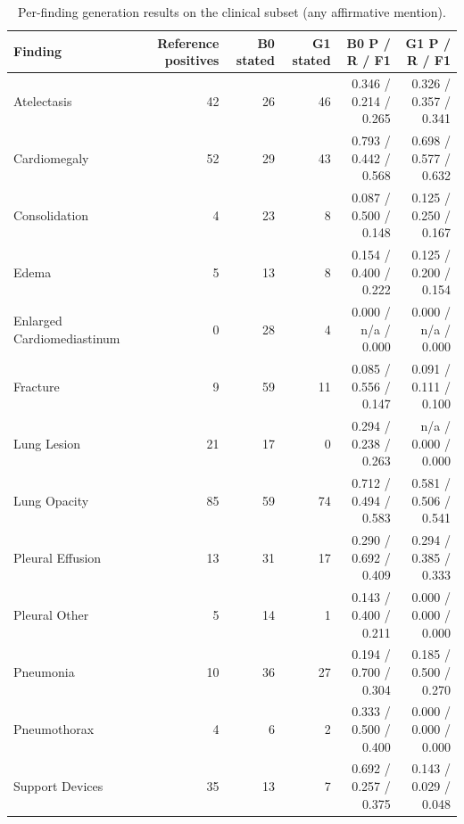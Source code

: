 \begin{table}[t]
\centering
\scriptsize
\begin{tabular}{lrrrrr}
\hline
Finding & Reference positives & B0 stated & G1 stated & B0 P / R / F1 & G1 P / R / F1 \\
\hline
Atelectasis & 42 & 26 & 46 & 0.346 / 0.214 / 0.265 & 0.326 / 0.357 / 0.341 \\
Cardiomegaly & 52 & 29 & 43 & 0.793 / 0.442 / 0.568 & 0.698 / 0.577 / 0.632 \\
Consolidation & 4 & 23 & 8 & 0.087 / 0.500 / 0.148 & 0.125 / 0.250 / 0.167 \\
Edema & 5 & 13 & 8 & 0.154 / 0.400 / 0.222 & 0.125 / 0.200 / 0.154 \\
Enlarged Cardiomediastinum & 0 & 28 & 4 & 0.000 / n/a / 0.000 & 0.000 / n/a / 0.000 \\
Fracture & 9 & 59 & 11 & 0.085 / 0.556 / 0.147 & 0.091 / 0.111 / 0.100 \\
Lung Lesion & 21 & 17 & 0 & 0.294 / 0.238 / 0.263 & n/a / 0.000 / 0.000 \\
Lung Opacity & 85 & 59 & 74 & 0.712 / 0.494 / 0.583 & 0.581 / 0.506 / 0.541 \\
Pleural Effusion & 13 & 31 & 17 & 0.290 / 0.692 / 0.409 & 0.294 / 0.385 / 0.333 \\
Pleural Other & 5 & 14 & 1 & 0.143 / 0.400 / 0.211 & 0.000 / 0.000 / 0.000 \\
Pneumonia & 10 & 36 & 27 & 0.194 / 0.700 / 0.304 & 0.185 / 0.500 / 0.270 \\
Pneumothorax & 4 & 6 & 2 & 0.333 / 0.500 / 0.400 & 0.000 / 0.000 / 0.000 \\
Support Devices & 35 & 13 & 7 & 0.692 / 0.257 / 0.375 & 0.143 / 0.029 / 0.048 \\
\hline
\end{tabular}
\caption{Per-finding generation results on the clinical subset (any affirmative mention).}
\label{tab:table3_per_finding_generation_results}
\end{table}
